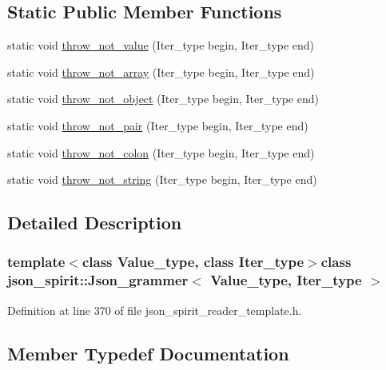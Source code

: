 \subsection*{Static Public Member Functions}
\begin{DoxyCompactItemize}
\item 
static void \hyperlink{classjson__spirit_1_1_json__grammer_a1227fb5b6bcd501b6d05d7e9cceee02b}{throw\+\_\+not\+\_\+value} (Iter\+\_\+type begin, Iter\+\_\+type end)
\item 
static void \hyperlink{classjson__spirit_1_1_json__grammer_ac64bb4d2e31662e43ef613ae52bfacfa}{throw\+\_\+not\+\_\+array} (Iter\+\_\+type begin, Iter\+\_\+type end)
\item 
static void \hyperlink{classjson__spirit_1_1_json__grammer_af243428007c7698e3d0a004c56986e30}{throw\+\_\+not\+\_\+object} (Iter\+\_\+type begin, Iter\+\_\+type end)
\item 
static void \hyperlink{classjson__spirit_1_1_json__grammer_ab3c938c81f4bb25ec28c8f2d8fb9deb3}{throw\+\_\+not\+\_\+pair} (Iter\+\_\+type begin, Iter\+\_\+type end)
\item 
static void \hyperlink{classjson__spirit_1_1_json__grammer_aba1fb3ab7a896435c92abf353e120d49}{throw\+\_\+not\+\_\+colon} (Iter\+\_\+type begin, Iter\+\_\+type end)
\item 
static void \hyperlink{classjson__spirit_1_1_json__grammer_a3697b8b95612a64914f7118af86a08c4}{throw\+\_\+not\+\_\+string} (Iter\+\_\+type begin, Iter\+\_\+type end)
\end{DoxyCompactItemize}


\subsection{Detailed Description}
\subsubsection*{template$<$class Value\+\_\+type, class Iter\+\_\+type$>$class json\+\_\+spirit\+::\+Json\+\_\+grammer$<$ Value\+\_\+type, Iter\+\_\+type $>$}



Definition at line 370 of file json\+\_\+spirit\+\_\+reader\+\_\+template.\+h.



\subsection{Member Typedef Documentation}
\hypertarget{classjson__spirit_1_1_json__grammer_af002d620720009cf1d1a8b7bdebcd704}{}

